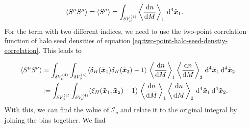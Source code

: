 \documentclass[../main.tex]{subfiles}
\begin{document}
\begin{align}
    \langle S^\mu  S^\mu \rangle = \langle S^\mu \rangle &= \int_{\delta V^{(4)}_\mu} \left\langle \frac{\mathrm{d} n}{\mathrm{d} M} \right\rangle_1 \,\mathrm{d}^4 \tilde{\boldsymbol{x}}_1.
\end{align}
For the term with two different indices, we need to use the two-point correlation function of halo seed densities of equation \ref{eq:two-point-halo-seed-denstiy-correlation}. This leads to 

\begin{align}
    \langle S^\mu  S^\nu \rangle &= \int_{\delta V^{(4)}_\mu} \int_{\delta V^{(4)}_\nu} \langle \delta_H(\tilde{\boldsymbol{x}}_1) \delta_H(\tilde{\boldsymbol{x}}_2) -1 \rangle\,\left\langle \frac{\mathrm{d} n}{\mathrm{d} M} \right\rangle_1 \left\langle \frac{\mathrm{d} n}{\mathrm{d} M} \right\rangle_2\,\mathrm{d}^4 \tilde{\boldsymbol{x}}_1 \, \mathrm{d}^4 \tilde{\boldsymbol{x}}_2\\
&\coloneqq \int_{\delta V^{(4)}_\mu} \int_{\delta V^{(4)}_\nu} ( \xi_H(\tilde{\boldsymbol{x}}_1,\tilde{\boldsymbol{x}}_2) -1 )\,\left\langle \frac{\mathrm{d} n}{\mathrm{d} M} \right\rangle_1 \left\langle \frac{\mathrm{d} n}{\mathrm{d} M} \right\rangle_2\,\mathrm{d}^4 \tilde{\boldsymbol{x}}_1 \, \mathrm{d}^4 \tilde{\boldsymbol{x}}_2.
\end{align}
With this, we can find the value of $\mathcal{I}_g$ and relate it to the original integral by joining the bins together. We find
\end{document}

